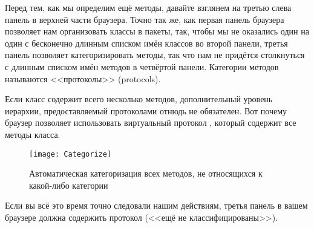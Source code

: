 \documentclass[a4paper,10pt,twoside]{book}
\begin{document}
Перед тем, как мы определим ещё методы, давайте взглянем на третью слева панель в верхней части браузера.
Точно так же, как первая панель браузера позволяет нам организовать классы в пакеты, так, чтобы мы не оказались один на один с бесконечно длинным списком имён классов во второй панели, третья панель позволяет категоризировать методы, так что нам не придётся столкнуться с длинным списком имён методов в четвёртой панели.
Категории методов называются <<протоколы>> (protocols).

Если класс содержит всего несколько методов, дополнительный уровень иерархии, предоставляемый протоколами отнюдь не обязателен.
Вот почему браузер позволяет использовать виртуальный протокол , который содержит все методы класса.

\begin{figure}[htbp]
   \centering
   \texttt{[image: Categorize]} 
   \caption{Автоматическая категоризация всех методов, не относящихся к какой-либо категории}
\end{figure}

Если вы всё это время точно следовали нашим действиям, третья панель в вашем браузере должна содержить протокол  (<<ещё не классифицированы>>).
\end{document}
